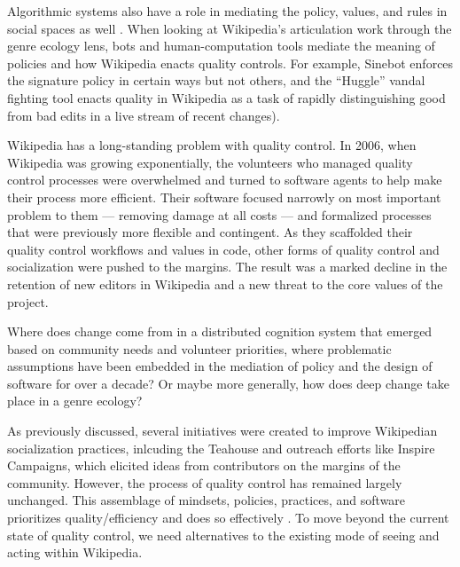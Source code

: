 Algorithmic systems also have a role in mediating the policy, values, and rules in social spaces as well\cite{lessig1999code} .  When looking at Wikipedia's articulation work through the genre ecology lens, bots and human-computation tools mediate the meaning of policies and how Wikipedia enacts quality controls. For example, Sinebot enforces the signature policy in certain ways but not others\cite{geiger2011lives}, and the ``Huggle'' vandal fighting tool enacts quality in Wikipedia as a task of rapidly distinguishing good from bad edits in a live stream of recent changes\cite{halfaker2014snuggle}).

  Wikipedia has a long-standing problem with quality control.  In 2006, when Wikipedia was growing exponentially, the volunteers who managed quality control processes were overwhelmed and turned to software agents to help make their process more efficient\cite{halfaker2014snuggle}.  Their software focused narrowly on most important problem to them --- removing damage at all costs --- and formalized processes that were previously more flexible and contingent. As they scaffolded their quality control workflows and values in code, other forms of quality control and socialization were pushed to the margins\cite{halfaker2013rise}.  The result was a marked decline in the retention of new editors in Wikipedia and a new threat to the core values of the project.

Where does change come from in a distributed cognition system that emerged based on community needs and volunteer priorities, where problematic assumptions have been embedded in the mediation of policy and the design of software for over a decade?  Or maybe more generally, how does deep change take place in a genre ecology?

As previously discussed, several initiatives were created to improve Wikipedian socialization practices, inlcuding the Teahouse and outreach efforts like Inspire Campaigns\cite{morgan2015what}, which elicited ideas from contributors on the margins of the community. However, the process of quality control has remained largely unchanged.  This assemblage of mindsets, policies, practices, and software prioritizes quality/efficiency and does so effectively \cite{geiger2013levee}\cite{halfaker2014snuggle}.  To move beyond the current state of quality control, we need alternatives to the existing mode of seeing and acting within Wikipedia.


